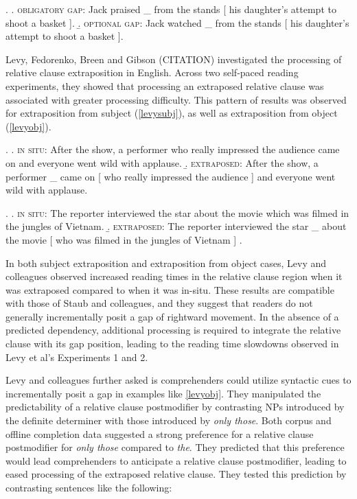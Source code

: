 \documentclass[12pt]{article}
\begin{document}
		\ex.	\label{hnpsstaub}
		\a.	\label{stauboblig} \textsc{obligatory gap}: Jack praised \_ from the stands [ his daughter's attempt to shoot a basket ].
		\b.	\label{stauboptional} \textsc{optional gap}: Jack watched \_ from the stands [ his daughter's attempt to shoot a basket ]. 

	Levy, Fedorenko, Breen and Gibson (CITATION) investigated the processing of relative clause extraposition in English. Across two self-paced reading experiments, they showed that processing an extraposed relative clause was associated with greater processing difficulty. This pattern of results was observed for extraposition from subject (\ref{levysubj}), as well as extraposition from object (\ref{levyobj}). 
	
			\ex.	\label{levysubj}
					\a.	 \textsc{in situ}: After the show, a performer who really impressed the audience came on and everyone went wild with applause.
					\b.	 \textsc{extraposed}: After the show, a performer \_ came on [ who really impressed the audience ] and everyone went wild with applause.

				\ex.	\label{levyobj}
					\a.	 \textsc{in situ}: The reporter interviewed the star about the movie which was filmed in the jungles of Vietnam.
					\b.	 \textsc{extraposed}: The reporter interviewed the star \_ about the movie [ who was filmed in the jungles of Vietnam ] .
	
	In both subject extraposition and extraposition from object cases, Levy and colleagues observed increased reading times in the relative clause region when it was extraposed compared to when it was in-situ. These results are compatible with those of Staub and colleagues, and they suggest that readers do not generally incrementally posit a gap of rightward movement. In the absence of a predicted dependency, additional processing is required to integrate the relative clause with its gap position, leading to the reading time slowdowns observed in Levy et al's Experiments 1 and 2. 

	Levy and colleagues further asked is comprehenders could utilize syntactic cues to incrementally posit a gap in examples like \ref{levyobj}. They manipulated the predictability of a relative clause postmodifier by contrasting NPs introduced by the definite determiner with those introduced by \textit{only those}. Both corpus and offline completion data suggested a strong preference for a relative clause postmodifier for \textit{only those} compared to \textit{the}. They predicted that this preference would lead comprehenders to anticipate a relative clause postmodifier, leading to eased processing of the extraposed relative clause. They tested this prediction by contrasting sentences like the following:
	
\end{document}
